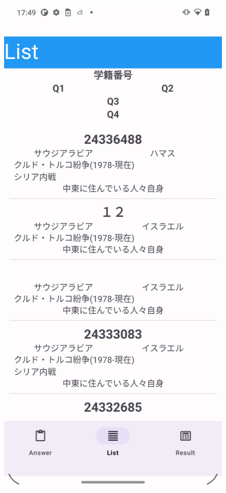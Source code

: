 \documentclass[titlepage,a4paper]{jsarticle}
\begin{document}
\begin{figure}[H]
\begin{minipage}[t]{0.40\textwidth}
  \end{minipage}
  \hfill
  \begin{minipage}[t]{0.40\textwidth}
    \centering
    \includegraphics[height=0.35\textheight]{img/move/app2.png}
  \end{minipage}


\end{figure}
\end{document}
